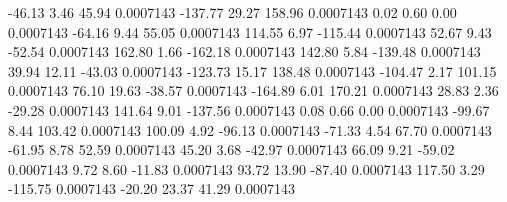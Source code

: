       -46.13        3.46       45.94     0.0007143
     -137.77       29.27      158.96     0.0007143
        0.02        0.60        0.00     0.0007143
      -64.16        9.44       55.05     0.0007143
      114.55        6.97     -115.44     0.0007143
       52.67        9.43      -52.54     0.0007143
      162.80        1.66     -162.18     0.0007143
      142.80        5.84     -139.48     0.0007143
       39.94       12.11      -43.03     0.0007143
     -123.73       15.17      138.48     0.0007143
     -104.47        2.17      101.15     0.0007143
       76.10       19.63      -38.57     0.0007143
     -164.89        6.01      170.21     0.0007143
       28.83        2.36      -29.28     0.0007143
      141.64        9.01     -137.56     0.0007143
        0.08        0.66        0.00     0.0007143
      -99.67        8.44      103.42     0.0007143
      100.09        4.92      -96.13     0.0007143
      -71.33        4.54       67.70     0.0007143
      -61.95        8.78       52.59     0.0007143
       45.20        3.68      -42.97     0.0007143
       66.09        9.21      -59.02     0.0007143
        9.72        8.60      -11.83     0.0007143
       93.72       13.90      -87.40     0.0007143
      117.50        3.29     -115.75     0.0007143
      -20.20       23.37       41.29     0.0007143
